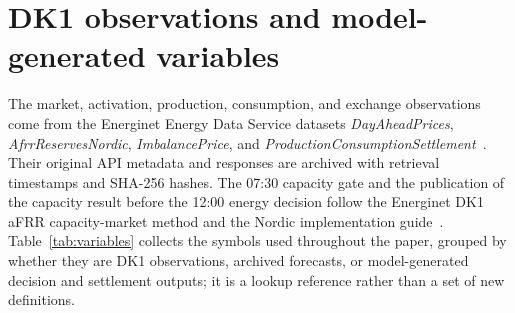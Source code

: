 \documentclass[11pt,a4paper]{article}
\begin{document}
\section{DK1 observations and model-generated variables}

The market, activation, production, consumption, and exchange observations
come from the Energinet Energy Data Service datasets \emph{DayAheadPrices},
\emph{AfrrReservesNordic}, \emph{ImbalancePrice}, and
\emph{ProductionConsumptionSettlement}~\cite{energineteds}.  Their original
API metadata and responses are archived with retrieval timestamps and SHA-256
hashes.  The 07:30 capacity gate and the publication of the capacity result
before the 12:00 energy decision follow the Energinet DK1 aFRR capacity-market
method and the Nordic implementation guide~\cite{energinetafrr,nordicfrr2026}.
Table~\ref{tab:variables} collects the symbols used throughout the paper,
grouped by whether they are DK1 observations, archived forecasts, or
model-generated decision and settlement outputs; it is a lookup reference
rather than a set of new definitions.
\end{document}

